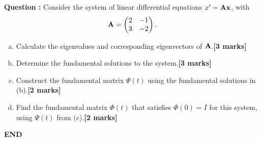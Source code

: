 \documentclass[11pt,a4paper]{article}
\newcounter{mk}
\newcommand{\mrk}[1]{\hfill\textbf{[#1 marks]}}
\newcommand{\qtion}{\stepcounter{mk}\textbf{Question \arabic{mk}: }}
\begin{document}
	\qtion Consider the system of linear differential equations $x^\prime = \vb{Ax}$, with
	$$
	\vb{A} =
	\begin{pmatrix}
		2 & -1\\
		3 & -2
	\end{pmatrix}.
	$$
	\begin{enumerate}[(a)]
		\item Calculate the eigenvalues and corresponding eigenvectors of $\vb{A}$.\mrk{3}
		\item Determine the fundamental solutions to the system.\mrk{3}
		\item Construct the fundamental matrix $\Psi(t)$ using the fundamental solutions in (b).\mrk{2}
		\item Find the fundamental matrix $\Phi(t)$ that satisfies $\Phi(0) = I$ for this system, using $\Psi(t)$ from (c).\mrk{2}
	\end{enumerate}
	\vfill\centering\textbf{END}
\end{document}
